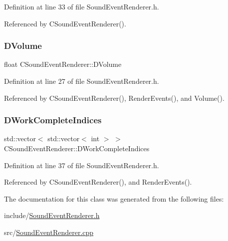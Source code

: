 Definition at line 33 of file Sound\+Event\+Renderer.\+h.



Referenced by C\+Sound\+Event\+Renderer().

\hypertarget{classCSoundEventRenderer_a3812aeb93aef90635a7da72fc101c686}{}\label{classCSoundEventRenderer_a3812aeb93aef90635a7da72fc101c686} 
\subsubsection{\texorpdfstring{D\+Volume}{DVolume}}
{\footnotesize\ttfamily float C\+Sound\+Event\+Renderer\+::\+D\+Volume\hspace{0.3cm}{\ttfamily [protected]}}



Definition at line 27 of file Sound\+Event\+Renderer.\+h.



Referenced by C\+Sound\+Event\+Renderer(), Render\+Events(), and Volume().

\hypertarget{classCSoundEventRenderer_a59a26b4062659921cfb24d7f76253938}{}\label{classCSoundEventRenderer_a59a26b4062659921cfb24d7f76253938} 
\subsubsection{\texorpdfstring{D\+Work\+Complete\+Indices}{DWorkCompleteIndices}}
{\footnotesize\ttfamily std\+::vector$<$ std\+::vector$<$ int $>$ $>$ C\+Sound\+Event\+Renderer\+::\+D\+Work\+Complete\+Indices\hspace{0.3cm}{\ttfamily [protected]}}



Definition at line 37 of file Sound\+Event\+Renderer.\+h.



Referenced by C\+Sound\+Event\+Renderer(), and Render\+Events().



The documentation for this class was generated from the following files\+:\begin{DoxyCompactItemize}
\item 
include/\hyperlink{SoundEventRenderer_8h}{Sound\+Event\+Renderer.\+h}\item 
src/\hyperlink{SoundEventRenderer_8cpp}{Sound\+Event\+Renderer.\+cpp}\end{DoxyCompactItemize}
